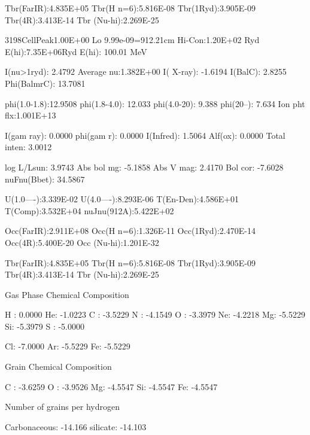 {           Tbr(FarIR):4.835E+05   Tbr(H n=6):5.816E-08   Tbr(1Ryd):3.905E-09
Tbr(4R):3.413E-14     Tbr (Nu-hi):2.269E-25


           3198CellPeak1.00E+00   Lo 9.99e-09=912.21cm   Hi-Con:1.20E+02
Ryd   E(hi):7.35E+06Ryd     E(hi):     100.01 MeV



                 I(nu>1ryd):   2.4792   Average nu:1.382E+00   I( X-ray):
-1.6194   I(BalC):   2.8255     Phi(BalmrC):  13.7081


                 phi(1.0-1.8):12.9508   phi(1.8-4.0): 12.033   phi(4.0-20):
9.388   phi(20--):  7.634     Ion pht flx:1.001E+13



                 I(gam ray):   0.0000   phi(gam r):   0.0000   I(Infred):
1.5064   Alf(ox):   0.0000     Total inten:   3.0012


           log L/Lsun:   3.9743   Abs bol mg:  -5.1858   Abs V mag:   2.4170
Bol cor:  -7.6028     nuFnu(Bbet):  34.5867



                 U(1.0----):3.339E-02  
U(4.0----):8.293E-06   T(En-Den):4.586E+01   T(Comp):3.532E+04
nuJnu(912A):5.422E+02


           Occ(FarIR):2.911E+08   Occ(H n=6):1.326E-11   Occ(1Ryd):2.470E-14
Occ(4R):5.400E-20     Occ (Nu-hi):1.201E-32

           Tbr(FarIR):4.835E+05   Tbr(H n=6):5.816E-08   Tbr(1Ryd):3.905E-09
Tbr(4R):3.413E-14     Tbr (Nu-hi):2.269E-25


                                                  Gas Phase Chemical
Composition

        H :  0.0000  He: -1.0223  C : -3.5229  N : -4.1549  O : -3.3979
Ne: -4.2218  Mg: -5.5229  Si: -5.3979  S : -5.0000

                                               Cl: -7.0000  Ar: -5.5229
Fe: -5.5229



                                                    Grain Chemical Composition

                                  C : -3.6259  O : -3.9526  Mg: -4.5547
Si: -4.5547  Fe: -4.5547



                                                  Number of grains per
hydrogen

                                            Carbonaceous: -14.166  silicate:
-14.103



}
